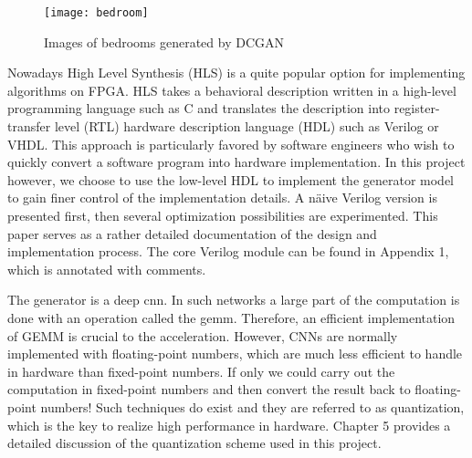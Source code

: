 \begin{figure}[h]
  \centering
  \texttt{[image: bedroom]}
  \caption{Images of bedrooms generated by DCGAN}
  \label{fig:bedroom}
\end{figure}

Nowadays High Level Synthesis (HLS) is a quite popular option for implementing algorithms on FPGA. HLS takes a
behavioral description written in a high-level programming language such as C and translates the description
into register-transfer level (RTL) hardware description language (HDL) such as Verilog or VHDL. This approach
is particularly favored by software engineers who wish to quickly convert a software program into
hardware implementation. In this project however, we choose to use the low-level HDL to implement the
generator model to gain finer control of the implementation details. A näive Verilog version is presented
first, then several optimization possibilities are experimented. This paper serves as a rather detailed
documentation of the design and implementation process. The core Verilog module can be found in Appendix 1,
which is annotated with comments.

The generator is a deep \gls{cnn}. In such networks a large part of the computation is done with an
operation called the \gls{gemm}. Therefore, an efficient implementation of GEMM is crucial to the
acceleration. However, CNNs are normally implemented with floating-point numbers, which are much less
efficient to handle in hardware than fixed-point numbers. If only we could carry out the computation in
fixed-point numbers and then convert the result back to floating-point numbers! Such techniques do exist
and they are referred to as quantization, which is the key to realize high performance in hardware. Chapter 5
provides a detailed discussion of the quantization scheme used in this project.

\clearpage %
